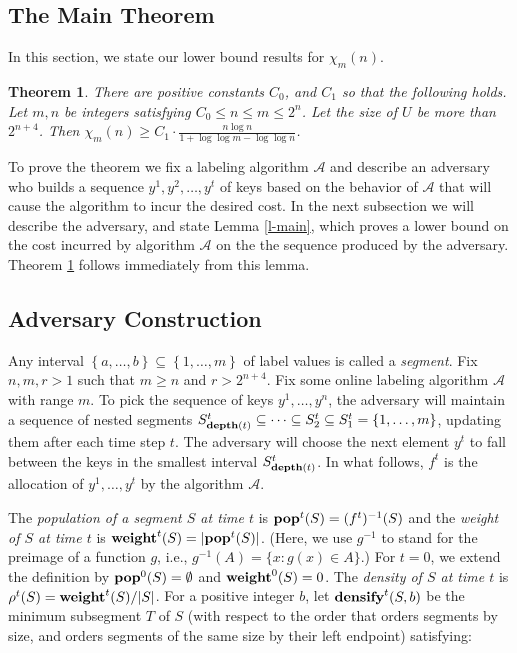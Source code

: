 \documentclass[11pt]{article}
\newtheorem{theorem}{Theorem} %
\newcommand{\A}{\mathcal{A}}
\newcommand{\natInt}[2]{ \left\{ #1, \dotsc, #2 \right\} }
\newcommand{\thmA}{{C_0}}
\newcommand{\thmB}{{C_1}}
\newcommand{\pop}{{\rm {\bf pop}}}
\newcommand{\weight}{{\rm {\bf weight}}}
\newcommand{\depth}{{\rm {\bf depth}}}
\newcommand{\densify}{{\rm {\bf densify}}}
\begin{document}
\subsection{The Main Theorem}
\label{subsec:main theorem}
In this section, we state our lower bound results for  $\chi_m(n)$.

\begin{theorem}
\label{thm:main}
There are positive constants $\thmA$, and $\thmB$ so that the following holds. Let $m,n$ be integers satisfying
$\thmA \leq n \le m \le 2^{n}$. Let the size of $U$ be more than $2^{n+4}$.
Then $\chi_m(n) \geq \thmB \cdot \frac{n \log n}{1 + \log \log m - \log \log n}$.
\end{theorem}

To prove the theorem we fix a labeling algorithm $\A$ and describe an adversary who 
builds a sequence $y^1,y^2,\dotsc,y^t$ of keys based on the behavior of $\A$  that will cause
the algorithm to incur the desired cost. In the next subsection we will describe the adversary,
and state Lemma \ref{l-main}, which proves a lower bound on the cost incurred
by algorithm $\A$ on the the sequence produced by the adversary.  Theorem \ref{thm:main} follows
immediately from this lemma.

\subsection{Adversary Construction}

Any interval $\natInt{a}{b} \subseteq \natInt{1}{m}$ of label values is called a \emph{segment}. Fix $n,m,r>1$ such that $m\ge n$ and $r>2^{n+4}$.
Fix some online labeling algorithm $\A$ with range $m$.
To pick the sequence of keys $y^1,\dotsc,y^n$, the adversary will maintain a sequence of
nested segments $S^t_{\depth(t)} \subseteq \dotsb \subseteq S^t_2 \subseteq S^t_1 = \natInt{1}{m}$, updating them after each time step $t$.
The adversary will choose the next element $y^{t}$ to fall between the keys in
the smallest interval $S^t_{\depth(t)}$. In what follows, $f^t$ is the allocation of $y^1,\dotsc,y^t$ by the algorithm $\A$.

The \emph{population of a segment $S$ at time $t$} is $\pop^t(S) = (f^t)^{-1}(S)$ and the
\emph{weight of $S$ at time $t$} is $\weight^t(S) = |\pop^t(S)|$. (Here, we use $g^{-1}$ to stand for the preimage of a function $g$, i.e., $g^{-1}(A) = \{ x : g(x) \in A \}$.)
For $t=0$, we extend the definition by $\pop^0(S) = \emptyset$ and $\weight^0(S) = 0$.
The \emph{density of $S$ at time $t$} is $\rho^t(S) = \weight^t(S) / |S|$. For a positive
integer $b$, let $\densify^t(S,b)$ be the minimum  subsegment $T$ of $S$ (with respect to the order that
orders segments by size, and orders segments of the same size by their left endpoint) satisfying:
\end{document}
